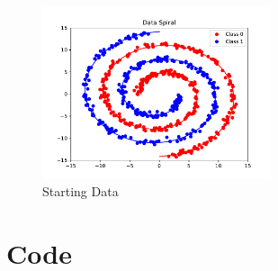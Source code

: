 \documentclass[twocolumn]{article}
\begin{document}
\begin{figure}[H]
    \centering
    \includegraphics[width=0.6\textwidth]{data.pdf}
    \caption{Starting Data}
\end{figure}

\newpage
\onecolumn
%

\newpage
\section{Code}

\end{document}
